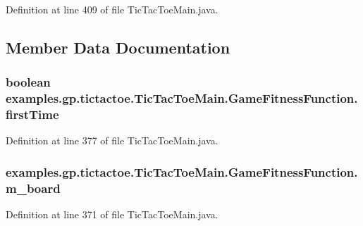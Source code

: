 Definition at line 409 of file Tic\-Tac\-Toe\-Main.\-java.



\subsection{Member Data Documentation}
\hypertarget{classexamples_1_1gp_1_1tictactoe_1_1_tic_tac_toe_main_1_1_game_fitness_function_a18f8018b67aae2eae61134de8a4c5f2f}{
\subsubsection[{first\-Time}]{\setlength{\rightskip}{0pt plus 5cm}boolean examples.\-gp.\-tictactoe.\-Tic\-Tac\-Toe\-Main.\-Game\-Fitness\-Function.\-first\-Time\hspace{0.3cm}{\ttfamily [private]}}}\label{classexamples_1_1gp_1_1tictactoe_1_1_tic_tac_toe_main_1_1_game_fitness_function_a18f8018b67aae2eae61134de8a4c5f2f}


Definition at line 377 of file Tic\-Tac\-Toe\-Main.\-java.

\hypertarget{classexamples_1_1gp_1_1tictactoe_1_1_tic_tac_toe_main_1_1_game_fitness_function_af84481dbececd35cce4ae5c2e59c7c93}{
\subsubsection[{m\-\_\-board}]{ examples.\-gp.\-tictactoe.\-Tic\-Tac\-Toe\-Main.\-Game\-Fitness\-Function.\-m\-\_\-board\hspace{0.3cm}{\ttfamily [private]}}}\label{classexamples_1_1gp_1_1tictactoe_1_1_tic_tac_toe_main_1_1_game_fitness_function_af84481dbececd35cce4ae5c2e59c7c93}


Definition at line 371 of file Tic\-Tac\-Toe\-Main.\-java.

